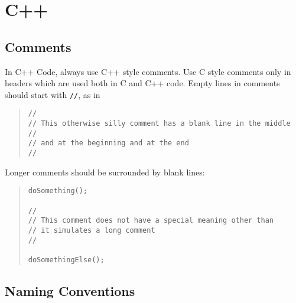 %
%

\chapter{C++}
\label{c:CS:++}

%
%

\section{Comments}


In C++ Code, always use C++ style comments.  Use C style comments only 
in headers which are used both in C and C++ code.  Empty lines in 
comments should start with \texttt{//}, as in

\begin{quote}
\begin{verbatim}
//
// This otherwise silly comment has a blank line in the middle
//
// and at the beginning and at the end
//
\end{verbatim}
\end{quote}

\noindent Longer comments should be surrounded by blank lines:

\begin{quote}
\begin{verbatim}
doSomething();

//
// This comment does not have a special meaning other than
// it simulates a long comment
//

doSomethingElse();
\end{verbatim}
\end{quote}


%
%

\section{Naming Conventions}


